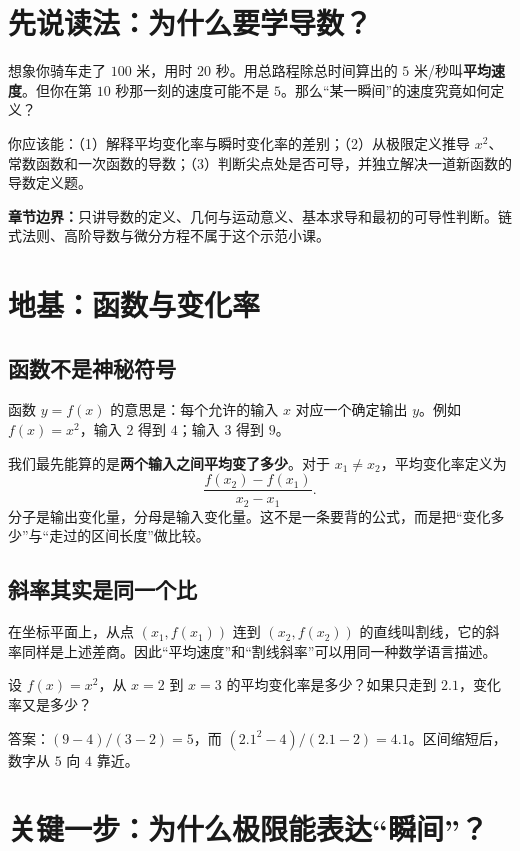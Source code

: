 \documentclass[12pt,a4paper,UTF8,fontset=none]{ctexart}
\begin{document}
\CourseCover
\section*{先说读法：为什么要学导数？}
想象你骑车走了 $100$ 米，用时 $20$ 秒。用总路程除总时间算出的 $5$ 米/秒叫\textbf{平均速度}。但你在第 $10$ 秒那一刻的速度可能不是 $5$。那么“某一瞬间”的速度究竟如何定义？

\begin{takeawaybox}[本章学完的三个验收目标]
你应该能：（1）解释平均变化率与瞬时变化率的差别；（2）从极限定义推导 $x^2$、常数函数和一次函数的导数；（3）判断尖点处是否可导，并独立解决一道新函数的导数定义题。
\end{takeawaybox}

\noindent\textbf{章节边界：}只讲导数的定义、几何与运动意义、基本求导和最初的可导性判断。链式法则、高阶导数与微分方程不属于这个示范小课。
\tableofcontents
\clearpage

\section{地基：函数与变化率}
\subsection{函数不是神秘符号}
函数 $y=f(x)$ 的意思是：每个允许的输入 $x$ 对应一个确定输出 $y$。例如 $f(x)=x^2$，输入 $2$ 得到 $4$；输入 $3$ 得到 $9$。

我们最先能算的是\textbf{两个输入之间平均变了多少}。对于 $x_1\ne x_2$，平均变化率定义为
\[
\frac{f(x_2)-f(x_1)}{x_2-x_1}.
\]
分子是输出变化量，分母是输入变化量。这不是一条要背的公式，而是把“变化多少”与“走过的区间长度”做比较。

\subsection{斜率其实是同一个比}
在坐标平面上，从点 $(x_1,f(x_1))$ 连到 $(x_2,f(x_2))$ 的直线叫割线，它的斜率同样是上述差商。因此“平均速度”和“割线斜率”可以用同一种数学语言描述。

\begin{trybox}
设 $f(x)=x^2$，从 $x=2$ 到 $x=3$ 的平均变化率是多少？如果只走到 $2.1$，变化率又是多少？
\end{trybox}

答案：$(9-4)/(3-2)=5$，而 $(2.1^2-4)/(2.1-2)=4.1$。区间缩短后，数字从 $5$ 向 $4$ 靠近。

\section{关键一步：为什么极限能表达“瞬间”？}
\end{document}
